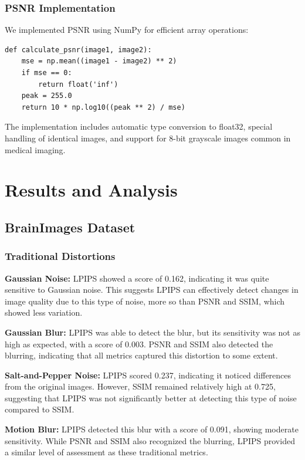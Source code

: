 \documentclass[a4paper,12pt]{article}
\begin{document}
\subsubsection{PSNR Implementation}
We implemented PSNR using NumPy for efficient array operations:

\begin{verbatim}
def calculate_psnr(image1, image2):
    mse = np.mean((image1 - image2) ** 2)
    if mse == 0:
        return float('inf')
    peak = 255.0
    return 10 * np.log10((peak ** 2) / mse)
\end{verbatim}

The implementation includes automatic type conversion to float32, special handling of identical images, and support for 8-bit grayscale images common in medical imaging.



\section{Results and Analysis}
\subsection{BrainImages Dataset}

\subsubsection{Traditional Distortions}

\textbf{Gaussian Noise:}  LPIPS showed a score of 0.162, indicating it was quite sensitive to Gaussian noise. This suggests LPIPS can effectively detect changes in image quality due to this type of noise, more so than PSNR and SSIM, which showed less variation.

\textbf{Gaussian Blur:}  LPIPS was able to detect the blur, but its sensitivity was not as high as expected, with a score of 0.003. PSNR and SSIM also detected the blurring, indicating that all metrics captured this distortion to some extent.

\textbf{Salt-and-Pepper Noise:} LPIPS scored 0.237, indicating it noticed differences from the original images. However, SSIM remained relatively high at 0.725, suggesting that LPIPS was not significantly better at detecting this type of noise compared to SSIM.

\textbf{Motion Blur:} LPIPS detected this blur with a score of 0.091, showing moderate sensitivity. While PSNR and SSIM also recognized the blurring, LPIPS provided a similar level of assessment as these traditional metrics.
\end{document}
